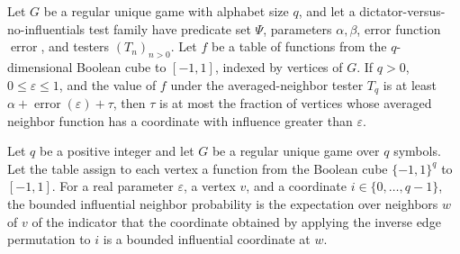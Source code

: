\begin{theorem}
\label{FABL.RegularUniqueGame.excess_le_boundedNeighborInfluentialVertexFraction}
\leanok
{}
Let $G$ be a regular unique game with alphabet size $q$, and let a dictator-versus-no-influentials test family have predicate set $\Psi$, parameters $\alpha,\beta$, error function $\operatorname{error}$, and testers $(T_n)_{n>0}$. Let $f$ be a table of functions from the $q$-dimensional Boolean cube to $[-1,1]$, indexed by vertices of $G$. If $q>0$, $0\leq\varepsilon\leq1$, and the value of $f$ under the averaged-neighbor tester $T_q$ is at least $\alpha+\operatorname{error}(\varepsilon)+\tau$, then $\tau$ is at most the fraction of vertices whose averaged neighbor function has a coordinate with influence greater than $\varepsilon$.
\end{theorem}

\begin{definition}
\label{FABL.RegularUniqueGame.boundedInfluentialNeighborProbability}
\leanok
{}
Let $q$ be a positive integer and let $G$ be a regular unique game over $q$ symbols. Let
the table assign to each vertex a function from the Boolean cube $\{−1,1\}^{q}$ to
$[-1,1]$. For a real parameter $\varepsilon$, a vertex $v$, and a coordinate
$i\in\{0,\ldots,q-1\}$, the bounded influential neighbor probability is the
expectation over neighbors $w$ of $v$ of the indicator that the coordinate obtained by
applying the inverse edge permutation to $i$ is a bounded influential coordinate at $w$.
\end{definition}

